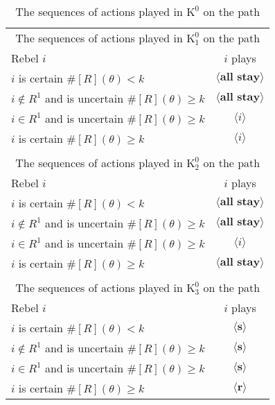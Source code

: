 \documentclass[12pt,letter]{article}
\newcommand{\Kappa}{\mathrm{K}}
\theoremstyle{definition}
\theoremstyle{remark}
\theoremstyle{claim}
\begin{document}
\begin{table}[!htbp]
\caption{The sequences of actions played in $\Kappa^0$ on the path}
\label{Table_cd0}
\begin{center}
\begin{tabular}{l c}
\multicolumn{2}{c}{The sequences of actions played in $\Kappa^0_{1}$ on the path}\\
Rebel $i$ 	 	&  	$i$ plays		 \\
\hline
\hline
$i$ is certain $\#[R](\theta)<k$ 	& 	$\langle \textbf{all stay} \rangle$	\\
$i\notin R^{1}$ and is uncertain $\#[R](\theta)\geq k$	& 	$\langle \textbf{all stay} \rangle$	\\
$i\in R^{1}$ and is uncertain $\#[R](\theta)\geq k$ &  $\langle i \rangle$  \\
$i$ is certain $\#[R](\theta)\geq k$ &  $\langle i \rangle$  \\
\hline
\\
\multicolumn{2}{c}{The sequences of actions played in $\Kappa^0_{2}$ on the path}\\
Rebel $i$ 	 	&  	$i$ plays		 \\
\hline
\hline
$i$ is certain $\#[R](\theta)<k$ 	& 	$\langle \textbf{all stay} \rangle$	\\
$i\notin R^{1}$ and is uncertain $\#[R](\theta)\geq k$	& 	$\langle \textbf{all stay} \rangle$	\\
$i\in R^{1}$ and is uncertain $\#[R](\theta)\geq k$ &  $\langle i \rangle$  \\
$i$ is certain $\#[R](\theta)\geq k$ &  $\langle \textbf{all stay} \rangle$  \\
\hline
\\
\multicolumn{2}{c}{The sequences of actions played in $\Kappa^0_{3}$ on the path}\\
Rebel $i$ 	 	&  	$i$ plays		 \\
\hline
\hline
$i$ is certain $\#[R](\theta)<k$ 	& 	$\langle \textbf{s} \rangle$	\\
$i\notin R^{1}$ and is uncertain $\#[R](\theta)\geq k$	& 	$\langle \textbf{s} \rangle$	\\
$i\in R^{1}$ and is uncertain $\#[R](\theta)\geq k$ &  $\langle \textbf{s} \rangle$  \\
$i$ is certain $\#[R](\theta)\geq k$ &  $\langle \textbf{r} \rangle$  \\
\hline
\end{tabular}
\end{center}
\end{table}
\end{document}
